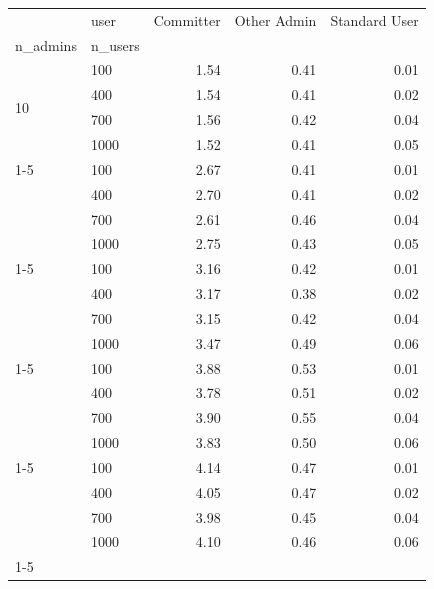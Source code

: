 \begin{tabular}{llrrr}
\toprule
 & user & Committer & Other Admin & Standard User \\
n_admins & n_users &  &  &  \\
\midrule
\multirow[t]{4}{*}{10} & 100 & 1.54 & 0.41 & 0.01 \\
                        & 400 & 1.54 & 0.41 & 0.02 \\
                        & 700 & 1.56 & 0.42 & 0.04 \\
                        & 1000 & 1.52 & 0.41 & 0.05 \\
\cline{1-5}
\multirow[t]{4}{*}{50} & 100 & 2.67 & 0.41 & 0.01 \\
                        & 400 & 2.70 & 0.41 & 0.02 \\
                        & 700 & 2.61 & 0.46 & 0.04 \\
                        & 1000 & 2.75 & 0.43 & 0.05 \\
\cline{1-5}
\multirow[t]{4}{*}{100} & 100 & 3.16 & 0.42 & 0.01 \\
                        & 400 & 3.17 & 0.38 & 0.02 \\
                        & 700 & 3.15 & 0.42 & 0.04 \\
                        & 1000 & 3.47 & 0.49 & 0.06 \\
\cline{1-5}
\multirow[t]{4}{*}{150} & 100 & 3.88 & 0.53 & 0.01 \\
                        & 400 & 3.78 & 0.51 & 0.02 \\
                        & 700 & 3.90 & 0.55 & 0.04 \\
                        & 1000 & 3.83 & 0.50 & 0.06 \\
\cline{1-5}
\multirow[t]{4}{*}{200} & 100 & 4.14 & 0.47 & 0.01 \\
                        & 400 & 4.05 & 0.47 & 0.02 \\
                        & 700 & 3.98 & 0.45 & 0.04 \\
                        & 1000 & 4.10 & 0.46 & 0.06 \\
\cline{1-5}
\bottomrule
\end{tabular}
